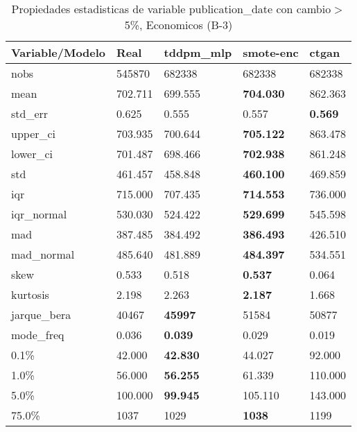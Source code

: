 \begin{table}[H]
\centering
\fontsize{8}{14}\selectfont
\caption{Propiedades estadisticas de variable publication\_date con cambio\ensuremath{>}5\%, Economicos (B-3)}
\label{table-stats-economicos-b-3-publication_date-short}
\begin{tabular}{|l|m{10em}|m{10em}|m{10em}|m{10em}|}
\hline
 \rowcolor[gray]{0.8}
Variable/Modelo & Real & tddpm\_mlp & smote-enc & ctgan \\
\hline nobs & 545870 & 682338 & 682338 & 682338 \\
\hline mean & 702.711 & 699.555 & \bfseries 704.030 & \cellcolor[rgb]{0.9, 0.54, 0.52} 862.363 \\
\hline std\_err & 0.625 & \cellcolor[rgb]{0.9, 0.54, 0.52} 0.555 & 0.557 & \bfseries 0.569 \\
\hline upper\_ci & 703.935 & 700.644 & \bfseries 705.122 & \cellcolor[rgb]{0.9, 0.54, 0.52} 863.478 \\
\hline lower\_ci & 701.487 & 698.466 & \bfseries 702.938 & \cellcolor[rgb]{0.9, 0.54, 0.52} 861.248 \\
\hline std & 461.457 & 458.848 & \bfseries 460.100 & \cellcolor[rgb]{0.9, 0.54, 0.52} 469.859 \\
\hline iqr & 715.000 & 707.435 & \bfseries 714.553 & \cellcolor[rgb]{0.9, 0.54, 0.52} 736.000 \\
\hline iqr\_normal & 530.030 & 524.422 & \bfseries 529.699 & \cellcolor[rgb]{0.9, 0.54, 0.52} 545.598 \\
\hline mad & 387.485 & 384.492 & \bfseries 386.493 & \cellcolor[rgb]{0.9, 0.54, 0.52} 426.510 \\
\hline mad\_normal & 485.640 & 481.889 & \bfseries 484.397 & \cellcolor[rgb]{0.9, 0.54, 0.52} 534.551 \\
\hline skew & 0.533 & 0.518 & \bfseries 0.537 & \cellcolor[rgb]{0.9, 0.54, 0.52} 0.064 \\
\hline kurtosis & 2.198 & 2.263 & \bfseries 2.187 & \cellcolor[rgb]{0.9, 0.54, 0.52} 1.668 \\
\hline jarque\_bera & 40467 & \bfseries 45997 & \cellcolor[rgb]{0.9, 0.54, 0.52} 51584 & 50877 \\
\hline mode\_freq & 0.036 & \bfseries 0.039 & 0.029 & \cellcolor[rgb]{0.9, 0.54, 0.52} 0.019 \\
\hline 0.1\% & 42.000 & \bfseries 42.830 & 44.027 & \cellcolor[rgb]{0.9, 0.54, 0.52} 92.000 \\
\hline 1.0\% & 56.000 & \bfseries 56.255 & 61.339 & \cellcolor[rgb]{0.9, 0.54, 0.52} 110.000 \\
\hline 5.0\% & 100.000 & \bfseries 99.945 & 105.110 & \cellcolor[rgb]{0.9, 0.54, 0.52} 143.000 \\
\hline 75.0\% & 1037 & 1029 & \bfseries 1038 & \cellcolor[rgb]{0.9, 0.54, 0.52} 1199 \\
\hline
\end{tabular}
\end{table}
